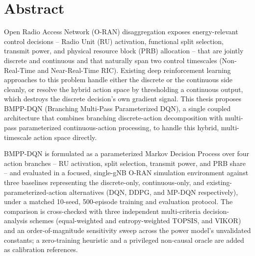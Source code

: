%

\chapter*{Abstract}

Open Radio Access Network (O-RAN) disaggregation exposes energy-relevant
control decisions -- Radio Unit (RU) activation, functional split
selection, transmit power, and physical resource block (PRB) allocation --
that are jointly discrete and continuous and that naturally span two
control timescales (Non-Real-Time and Near-Real-Time RIC). Existing deep
reinforcement learning approaches to this problem handle either the
discrete or the continuous side cleanly, or resolve the hybrid action
space by thresholding a continuous output, which destroys the discrete
decision's own gradient signal. This thesis proposes BMPP-DQN (Branching
Multi-Pass Parameterized DQN), a single coupled architecture that combines
branching discrete-action decomposition with multi-pass parameterized
continuous-action processing, to handle this hybrid, multi-timescale
action space directly.

BMPP-DQN is formulated as a parameterized Markov Decision Process over
four action branches -- RU activation, split selection, transmit power, and
PRB share -- and evaluated in a focused, single-gNB O-RAN simulation
environment against three baselines representing the discrete-only,
continuous-only, and existing-parameterized-action alternatives (DQN,
DDPG, and MP-DQN respectively), under a matched 10-seed, 500-episode
training and evaluation protocol. The comparison is cross-checked with
three independent multi-criteria decision-analysis schemes
(equal-weighted and entropy-weighted TOPSIS, and VIKOR) and an
order-of-magnitude sensitivity sweep across the power model's unvalidated
constants; a zero-training heuristic and a privileged non-causal oracle
are added as calibration references.

